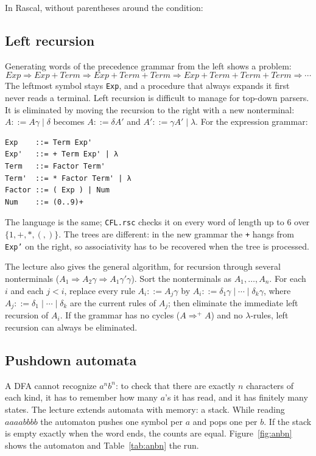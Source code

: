 In Rascal, without parentheses around the condition:

\subsection{Left recursion}

Generating words of the precedence grammar from the left shows a problem:
\[
Exp \Rightarrow Exp + Term \Rightarrow Exp + Term + Term \Rightarrow Exp + Term + Term + Term \Rightarrow \cdots
\]
The leftmost symbol stays \texttt{Exp}, and a procedure that always expands it
first never reads a terminal. Left recursion is difficult to manage for
top-down parsers. It is eliminated by moving the recursion to the right with
a new nonterminal: $A ::= A\gamma \mid \delta$ becomes $A ::= \delta A'$ and
$A' ::= \gamma A' \mid \lambda$. For the expression grammar:
\begin{lstlisting}
Exp    ::= Term Exp'
Exp'   ::= + Term Exp' | λ
Term   ::= Factor Term'
Term'  ::= * Factor Term' | λ
Factor ::= ( Exp ) | Num
Num    ::= (0..9)+
\end{lstlisting}
The language is the same; \texttt{CFL.rsc} checks it on every word of length up
to 6 over $\{1, +, *, (, )\}$. The trees are different: in the new grammar the
\texttt{+} hangs from \texttt{Exp'} on the right, so associativity has to be
recovered when the tree is processed.

The lecture also gives the general algorithm, for recursion through several
nonterminals ($A_1 \Rightarrow A_2\gamma \Rightarrow A_1\gamma'\gamma$). Sort the
nonterminals as $A_1, \dots, A_n$. For each $i$ and each $j < i$, replace every
rule $A_i ::= A_j\gamma$ by $A_i ::= \delta_1\gamma \mid \cdots \mid \delta_k\gamma$, where
$A_j ::= \delta_1 \mid \cdots \mid \delta_k$ are the current rules of $A_j$; then
eliminate the immediate left recursion of $A_i$. If the grammar has no cycles
($A \Rightarrow^+ A$) and no $\lambda$-rules, left recursion can always be eliminated.

\subsection{Pushdown automata}

A DFA cannot recognize $a^n b^n$: to check that there are exactly $n$
characters of each kind, it has to remember how many $a$'s it has read, and
it has finitely many states. The lecture extends automata with memory: a stack.
While reading $aaaabbbb$ the automaton pushes one symbol per $a$ and pops one
per $b$. If the stack is empty exactly when the word ends, the counts are
equal. Figure~\ref{fig:anbn} shows the automaton and Table~\ref{tab:anbn} the
run.

